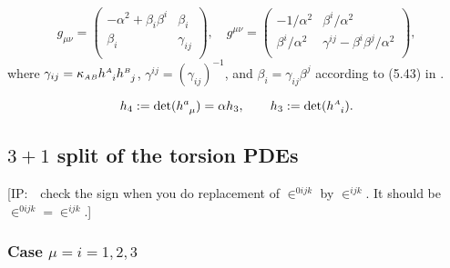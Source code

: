 \documentclass[
10pt, %
a4paper, %
oneside, %
headinclude,footinclude, %
BCOR5mm, %
]{scrartcl}
\newcommand{\IP}[1]{{\color{Red}[IP:\ \ #1]}}
\newcommand{\sA}{\mathsmaller A}
\newcommand{\sB}{\mathsmaller B}
\newcommand{\tetrsymbol}{h}
\newcommand{\tetr}[2]{\tetrsymbol^{#1}_{\phantom{#1}#2}}
\newcommand{\detTetr}{\tetrsymbol}
\newcommand{\LCsymb}{\bm{\in}}    %
\begin{document}
\begin{equation}
	g_{\mu\nu} = \left(
	\begin{array}{cc}
		-\alpha^2 + \beta_i\beta^i & \beta_i \\[1mm]
		\beta_i & \gamma_{ij}  \\
	\end{array}
	\right) ,
	\quad
	g^{\mu\nu} = \left(
	\begin{array}{cc}
		-1/\alpha^2       & \beta^i/\alpha^2 \\[1mm]
		\beta^{i}/\alpha^2 & \gamma^{ij} - \beta^i\beta^j/\alpha^2  \\
	\end{array}
	\right) ,
\end{equation}
where $ \gamma_{ij} = \kappa_{\sA\sB} \tetr{\sA}{i}\tetr{\sB}{j}$, $ 
\gamma^{ij} = \left( \gamma_{ij} \right)^{-1}  $, and $ \beta_i =  \gamma_{ij}\beta^j$ 
according to (5.43) in \cite{Gourgoulhon2012a}.

\begin{equation}\label{eq.det}
	\detTetr_4 := \det(\tetr{a}{\mu}) = \alpha \detTetr_3, \qquad \detTetr_3 := \det(\tetr{\sA}{i}).
\end{equation}

\subsection{$ 3+1 $ split of the torsion PDEs}	\label{ssec.31.tors}

\IP{check the sign when you do replacement of $ \LCsymb^{0ijk} $ by $ \LCsymb^{ijk} $. It should be 
$ \LCsymb^{0ijk} = \LCsymb^{ijk} $.}

\subsubsection{Case $ \mu = i=1,2,3 $} 
\end{document}
